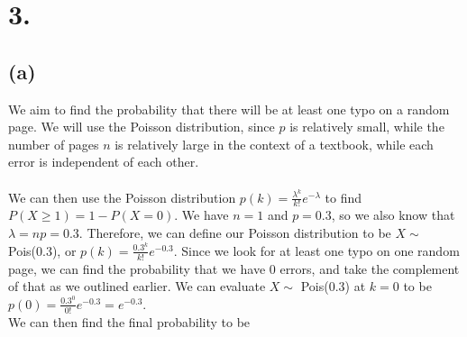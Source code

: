 \documentclass{article}
\begin{document}
\section*{3.}
{\Large 

\subsection*{(a)}
We aim to find the probability that there will be at least one typo on a random page. We will use the Poisson distribution, since $p$ is relatively small, while the number of pages $n$ is relatively large in the context of a textbook, while each error is independent of each other. \\ \\ 
We can then use the Poisson distribution $p(k) = \frac{\lambda^k}{k!}e^{-\lambda}$ to find $P(X \geq 1) = 1 - P(X = 0)$. We have $n = 1$ and $p = 0.3$, so we also know that $\lambda = np = 0.3$. Therefore, we can define our Poisson distribution to be $X \sim $ Pois(0.3), or $p(k) = \frac{0.3^k}{k!}e^{-0.3}$. Since we look for at least one typo on one random page, we can find the probability that we have 0 errors, and take the complement of that as we outlined earlier. We can evaluate $X \sim $ Pois(0.3) at $k = 0$ to be $p(0) = \frac{0.3^0}{0!}e^{-0.3} = e^{-0.3}$.
\\ We can then find the final probability to be 

}
\end{document}
